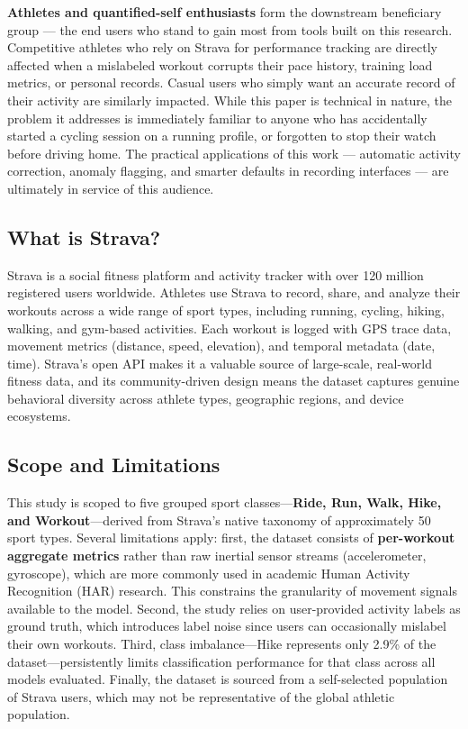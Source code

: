 \documentclass[11pt, onecolumn]{article}
\begin{document}
\textbf{Athletes and quantified-self enthusiasts} form the downstream 
beneficiary group --- the end users who stand to gain most from tools built on 
this research. Competitive athletes who rely on Strava for performance tracking 
are directly affected when a mislabeled workout corrupts their pace history, 
training load metrics, or personal records. Casual users who simply want an 
accurate record of their activity are similarly impacted. While this paper is 
technical in nature, the problem it addresses is immediately familiar to anyone 
who has accidentally started a cycling session on a running profile, or forgotten 
to stop their watch before driving home. The practical applications of this 
work --- automatic activity correction, anomaly flagging, and smarter defaults 
in recording interfaces --- are ultimately in service of this audience.

\subsection{What is Strava?}

Strava is a social fitness platform and activity tracker with over 120 million registered users worldwide. Athletes use Strava to record, share, and analyze their workouts across a wide range of sport types, including running, cycling, hiking, walking, and gym-based activities. Each workout is logged with GPS trace data, movement metrics (distance, speed, elevation), and temporal metadata (date, time). Strava's open API makes it a valuable source of large-scale, real-world fitness data, and its community-driven design means the dataset captures genuine behavioral diversity across athlete types, geographic regions, and device ecosystems.

\subsection{Scope and Limitations}

This study is scoped to five grouped sport classes---\textbf{Ride, Run, Walk, Hike, and Workout}---derived from Strava's native taxonomy of approximately 50 sport types. Several limitations apply: first, the dataset consists of \textbf{per-workout aggregate metrics} rather than raw inertial sensor streams (accelerometer, gyroscope), which are more commonly used in academic Human Activity Recognition (HAR) research. This constrains the granularity of movement signals available to the model. Second, the study relies on user-provided activity labels as ground truth, which introduces label noise since users can occasionally mislabel their own workouts. Third, class imbalance---Hike represents only 2.9\% of the dataset---persistently limits classification performance for that class across all models evaluated. Finally, the dataset is sourced from a self-selected population of Strava users, which may not be representative of the global athletic population.
\end{document}
